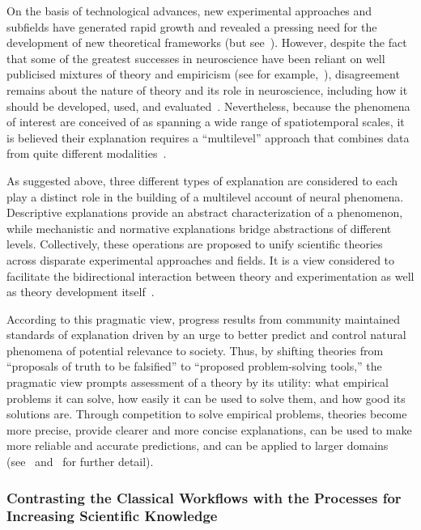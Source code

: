 \documentclass[10pt,letterpaper]{article}
\begin{document}
On the basis of technological advances, new experimental approaches and subfields have generated rapid growth and revealed a pressing need for the development of new theoretical frameworks (but see~\cite{phillips15}). However, despite the fact that some of the greatest successes in neuroscience have been reliant on well publicised mixtures of theory and empiricism (see for example,~\cite{hodgkin52e,okeefe78,traub91,marr10,vaina91}), disagreement remains about the nature of theory and its role in neuroscience, including how it should be developed, used, and evaluated~\cite{bialek18,goldstein18}. Nevertheless, because the phenomena of interest are conceived of as spanning a wide range of spatiotemporal scales, it is believed their explanation requires a “multilevel” approach that combines data from quite different modalities~\cite{levenstein23}.

As suggested above, three different types of explanation are considered to each play a distinct role in the building of a multilevel account of neural phenomena. Descriptive explanations provide an abstract characterization of a phenomenon, while mechanistic and normative explanations bridge abstractions of different levels. Collectively, these operations are proposed to unify scientific theories across disparate experimental approaches and fields. It is a view considered to facilitate the bidirectional interaction between theory and experimentation as well as theory development itself~\cite{levenstein23}.

According to this pragmatic view, progress results from community maintained standards of explanation driven by an urge to better predict and control natural phenomena of potential relevance to society. Thus, by shifting theories from “proposals of truth to be falsified” to “proposed problem-solving tools,” the pragmatic view prompts assessment of a theory by its utility: what empirical problems it can solve, how easily it can be used to solve them, and how good its solutions are. Through competition to solve empirical problems, theories become more precise, provide clearer and more concise explanations, can be used to make more reliable and accurate predictions, and can be applied to larger domains (see~\cite{levenstein23} and~\cite{douglas14} for further detail). 

\subsubsection*{Contrasting the Classical Workflows with the Processes for Increasing Scientific Knowledge}
\end{document}
